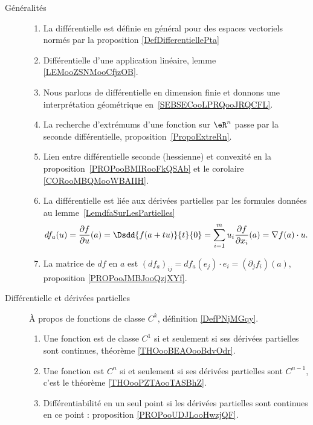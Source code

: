 \begin{description}
	\item[Généralités]
		\begin{enumerate}
			\item
			      La différentielle est définie en général pour des espaces vectoriels normés par la proposition \ref{DefDifferentiellePta}
			\item
			      Différentielle d'une application linéaire, lemme \ref{LEMooZSNMooCfjzOB}.
			\item
			      Nous parlons de différentielle en dimension finie et donnons une interprétation géométrique en~\ref{SEBSECooLPRQooJRQCFL}.
			\item
			      La recherche d'extrémums d'une fonction sur \( \eR^n\) passe par la seconde différentielle, proposition~\ref{PropoExtreRn}.
			\item
			      Lien entre différentielle seconde (hessienne) et convexité en la proposition~\ref{PROPooBMIRooFkQSAb} et le corolaire \ref{CORooMBQMooWBAIIH}.
			\item
			      La différentielle est liée aux dérivées partielles par les formules données au lemme~\ref{LemdfaSurLesPartielles}
			      \begin{equation}
				      df_a(u)=\frac{ \partial f }{ \partial u }(a)=\Dsdd{ f(a+tu) }{t}{0}=\sum_{i=1}^mu_i\frac{ \partial f }{ \partial x_i }(a)=\nabla f(a)\cdot u.
			      \end{equation}
			\item
			      La matrice de \( df\) en \( a\) est \( (df_a)_{ij}=df_a(e_j)\cdot e_i=(\partial_jf_i)(a)\), proposition \ref{PROPooJMBJooQzjXYf}.
		\end{enumerate}
	\item[Différentielle et dérivées partielles]
		À propos de fonctions de classe \( C^k\), définition \ref{DefPNjMGqy}.
		\begin{enumerate}
			\item
			      Une fonction est de classe \( C^1\) si et seulement si ses dérivées partielles sont continues, théorème \ref{THOooBEAOooBdvOdr}.
			\item
			      Une fonction est \( C^n\) si et seulement si ses dérivées partielles sont \( C^{n-1}\), c'est le théorème \ref{THOooPZTAooTASBhZ}.
			\item
			      Différentiabilité en un seul point si les dérivées partielles sont continues en ce point : proposition \ref{PROPooUDJLooHwzjQF}.
		\end{enumerate}

\end{description}
